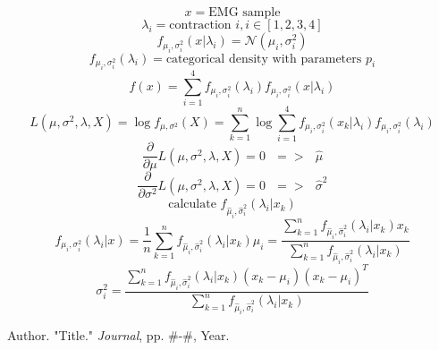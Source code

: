 \documentclass[times, 10pt,twocolumn]{article}
\begin{document}
\begin{equation}
x = \text{EMG sample}
\end{equation}
\begin{equation}
\lambda_i = \text{contraction }i, i\in[1,2,3,4]
\end{equation}
\begin{equation}
f_{\mu_i,\sigma_i^2}(x|\lambda_i) = \mathcal{N}(\mu_i,\sigma_i^2)
\end{equation}
\begin{equation}
f_{\mu_i,\sigma_i^2}(\lambda_i) = \text{categorical density with parameters } p_i
\end{equation}
\begin{equation}
f(x) = \sum_{i=1}^{4}f_{\mu_i,\sigma_i^2}(\lambda_i)f_{\mu_i,\sigma_i^2}(x|\lambda_i)
\end{equation}
\begin{equation}
L(\mu,\sigma^2,\lambda,X) = \log{f_{\mu,\sigma^2}(X)} = \sum_{k=1}^{n}\log{\sum_{i=1}^{4}f_{\mu_i,\sigma_i^2}(x_k|\lambda_i)f_{\mu_i,\sigma_i^2}(\lambda_i)}
\end{equation}
\begin{equation}
\frac{\partial}{\partial{\mu}}L(\mu,\sigma^2,\lambda,X) = 0 \text{ } => \text{ } \hat{\mu}
\end{equation}
\begin{equation}
\frac{\partial}{\partial{\sigma^2}}L(\mu,\sigma^2,\lambda,X) = 0 \text{ } => \text{ } \hat{\sigma}^2
\end{equation}
\begin{equation}
\text{calculate } f_{\hat{\mu}_i,\hat{\sigma}_i^2}(\lambda_i|x_k)
\end{equation}
\begin{equation}
f_{\mu_i,\sigma_i^2}(\lambda_i|x) = \frac{1}{n}\sum_{k=1}^{n}f_{\hat{\mu}_i,\hat{\sigma}_i^2}(\lambda_i|x_k)
\mu_i = \frac{\sum_{k=1}^{n}f_{\hat{\mu}_i,\hat{\sigma}_i^2}(\lambda_i|x_k)x_k}{\sum_{k=1}^{n}f_{\hat{\mu}_i,\hat{\sigma}_i^2}(\lambda_i|x_k)}
\end{equation}
\begin{equation}
\sigma_i^2 = \frac{\sum_{k=1}^{n}f_{\hat{\mu}_i,\hat{\sigma}_i^2}(\lambda_i|x_k)(x_k-\mu_i)(x_k-\mu_i)^T}{\sum_{k=1}^{n}f_{\hat{\mu}_i,\hat{\sigma}_i^2}(\lambda_i|x_k)}
\end{equation}

\nocite{ex1,ex2}



\begin{thebibliography}{}\setlength{\itemsep}{-1ex}\small

Author. "Title." \textit{Journal}, pp. \#-\#, Year.

\end{thebibliography}
\end{document}
